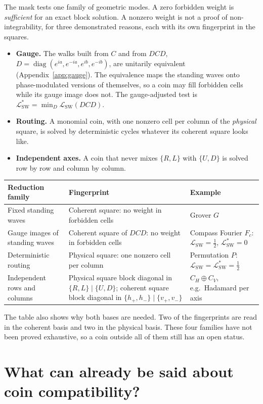 \documentclass[11pt,a4paper,oneside]{report}
\newcommand{\diag}{\operatorname{diag}}
\newcommand{\sw}{\mathrm{SW}}
\numberwithin{equation}{chapter}
\begin{document}
The mask tests one family of geometric modes. A zero forbidden weight is
\emph{sufficient} for an exact block solution. A nonzero weight is not a
proof of non-integrability, for three demonstrated reasons, each with its
own fingerprint in the squares.
\begin{itemize}
\item \textbf{Gauge.} The walks built from \(C\) and from
\(DCD\), \(D=\diag(e^{ia},e^{-ia},e^{ib},e^{-ib})\), are unitarily
equivalent (Appendix~\ref{app:gauge}). The equivalence maps the standing
waves onto phase-modulated versions of themselves, so a coin may fill
forbidden cells while its gauge image does not. The gauge-adjusted test
is
\(\mathcal L^*_{\sw}=\min_D\mathcal L_{\sw}(DCD)\).
\item \textbf{Routing.} A monomial coin, with one nonzero cell per column
of the \emph{physical} square, is solved by deterministic cycles whatever
its coherent square looks like.
\item \textbf{Independent axes.} A coin that never mixes \(\{R,L\}\) with
\(\{U,D\}\) is solved row by row and column by column.
\end{itemize}
\begin{center}\small
\begin{tabularx}{\textwidth}{@{}lYY@{}}\toprule
Reduction family & Fingerprint & Example\\\midrule
Fixed standing waves & Coherent square: no weight in forbidden cells
& Grover \(G\)\\
Gauge images of standing waves & Coherent square of \(DCD\): no weight in forbidden cells
& Compass Fourier \(F_c\): \(\mathcal L_{\sw}=\tfrac12\), \(\mathcal L^*_{\sw}=0\)\\
Deterministic routing & Physical square: one nonzero cell per column
& Permutation \(P\): \(\mathcal L_{\sw}=\mathcal L^*_{\sw}=\tfrac12\)\\
Independent rows and columns & Physical square block diagonal in
\(\{R,L\}\mid\{U,D\}\); coherent square block diagonal in
\(\{h_+,h_-\}\mid\{v_+,v_-\}\) & \(C_H\oplus C_V\), e.g.\ Hadamard per axis\\\bottomrule
\end{tabularx}
\end{center}
The table also shows why both bases are needed. Two of the
fingerprints are read in the coherent basis and two in the physical
basis. These four families have not been proved exhaustive, so a coin
outside all of them still has an open status.

\section{What can already be said about coin compatibility?}
\end{document}
